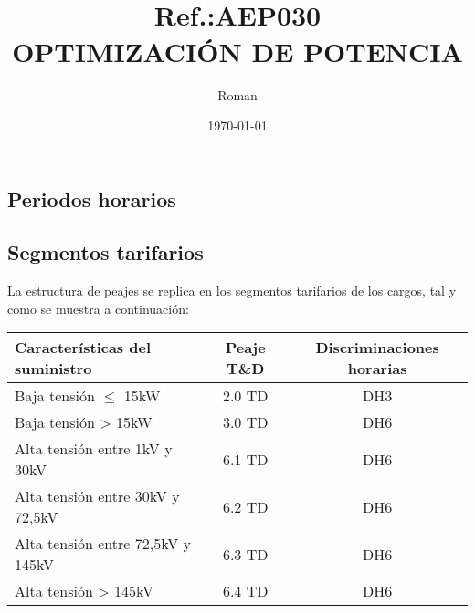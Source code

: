 \documentclass[a4paper,10pt]{article}
\title{{ \qrcode[height=1.3cm]{https://doctec.blog/} \\ \small Ref.:\uppercase{Aep030}}\\{\textbf{OPTIMIZACIÓN DE POTENCIA}}}
\author{
Roman
}
\date{\today}
\begin{document}
\begin{Form}
	\maketitle

	\tableofcontents  %
	\listoffigures    %
	\listoftables     %



    
\newpage
























\section{Periodos horarios}



\subsection{Segmentos tarifarios}

La estructura de peajes se replica en los segmentos tarifarios de los cargos, tal y como se muestra a continuación:

\begin{center}
\begin{tabular}{>{\raggedright\arraybackslash}p{6cm} c c}
\toprule
\textbf{Características del suministro} & \textbf{Peaje T\&D} & \textbf{Discriminaciones horarias} \\
\midrule
Baja tensión $\leq$ 15kW & 2.0 TD & DH3 \\
Baja tensión > 15kW & 3.0 TD & DH6 \\
Alta tensión entre 1kV y 30kV & 6.1 TD & DH6 \\
Alta tensión entre 30kV y 72,5kV & 6.2 TD & DH6 \\
Alta tensión entre 72,5kV y 145kV & 6.3 TD & DH6 \\
Alta tensión > 145kV & 6.4 TD & DH6 \\
\bottomrule
\end{tabular}
\end{center}



\end{Form}
\end{document}
